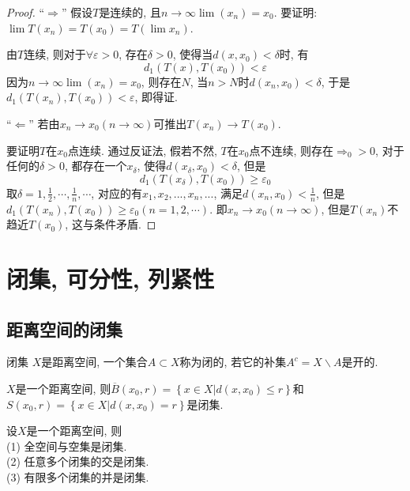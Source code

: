 \documentclass[lang=cn,10pt]{gorgeousnbook}
\numberwithin{equation}{section}%
\numberwithin{figure}{section}%
\begin{document}
\begin{proof}
“$\Rightarrow$” 假设$T$是连续的, 且${n\rightarrow \infty}{\lim}\left( x_n \right)=x_0$. 要证明:${\lim}T\left( x_n \right) =T\left( x_0 \right) =T\left( {\lim}x_n \right) $.

由$T$连续, 则对于$\forall \varepsilon>0$, 存在$\delta>0$, 使得当$d(x,x_0)<\delta$时, 有
\begin{equation}
d_1\left( T\left( x \right) ,T\left( x_0 \right) \right) <\varepsilon 
\end{equation}
因为${n\rightarrow \infty}{\lim}\left( x_n \right)=x_0$, 则存在$N$, 当$n>N$时$d(x_n,x_0)<\delta$, 于是$d_1\left( T\left( x_n \right) ,T\left( x_0 \right) \right) <\varepsilon $, 即得证.

“$\Leftarrow$”  若由$x_n\rightarrow x_0\left( n\rightarrow \infty \right) $可推出$T\left( x_n \right) \rightarrow T\left( x_0 \right) $.

要证明$T$在$x_0$点连续. 通过反证法, 假若不然, $T$在$x_0$点不连续, 则存在$\Rightarrow_0>0$, 对于任何的$\delta>0$, 都存在一个$x_{\delta}$, 使得$d(x_{\delta},x_0)<\delta$, 但是
\begin{equation}
d_1\left( T\left( x _{\delta}\right) ,T\left( x_0 \right) \right) \ge\varepsilon_0
\end{equation}
取$\delta = 1,\frac{1}{2},\cdots,\frac{1}{n},\cdots$, 对应的有$x_1,x_2,...,x_n,...$, 满足$d(x_n,x_0)<\frac{1}{n}$, 但是$d_1\left( T\left( x_n \right) ,T\left( x_0 \right) \right) \ge \varepsilon _0\left( n=1,2,\cdots \right) $. 即$x_n\rightarrow x_0\left( n\rightarrow \infty \right) $, 但是$T(x_n)$不趋近$T(x_0)$, 这与条件矛盾. 
\end{proof}
\section{闭集, 可分性, 列紧性}
\subsection{距离空间的闭集}
\begin{definition}{闭集}
$X$是距离空间, 一个集合$A\subset X$称为闭的, 若它的补集$A^c=X\backslash A$是开的. 
\end{definition}
\begin{theorem}
$X$是一个距离空间, 则$\overline{B}\left( x_0,r \right) =\left\{ x\in X|d\left( x,x_0 \right) \le r \right\} $和$S\left( x_0,r \right) =\left\{ x\in X|d\left( x,x_0 \right) =r \right\} $是闭集. 
\end{theorem}
\begin{theorem}
设$X$是一个距离空间, 则\\
(1) 全空间与空集是闭集. \\
(2) 任意多个闭集的交是闭集. \\
(3) 有限多个闭集的并是闭集.
\end{theorem}
\end{document}
